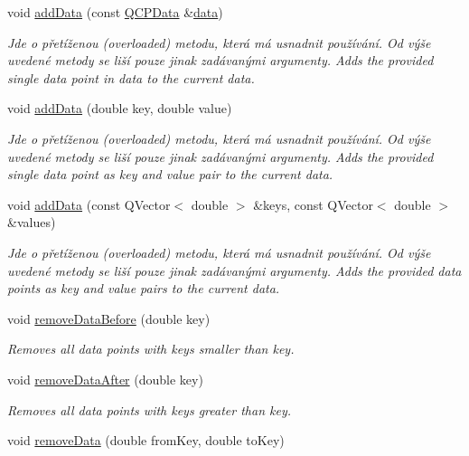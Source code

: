 \begin{DoxyCompactItemize}
void \hyperlink{classQCPGraph_a80cc91e1e0ef77eb50afc5b366d0efd9}{add\+Data} (const \hyperlink{classQCPData}{Q\+C\+P\+Data} \&\hyperlink{classQCPGraph_a2f58436df4f86a2792b776a21642b3d9}{data})
\begin{DoxyCompactList}\small\item\em Jde o přetíženou (overloaded) metodu, která má usnadnit používání. Od výše uvedené metody se liší pouze jinak zadávanými argumenty. Adds the provided single data point in {\itshape data} to the current data. \end{DoxyCompactList}\item 
void \hyperlink{classQCPGraph_a0bf98b1972286cfb7b1c4b7dd6ae2012}{add\+Data} (double key, double value)
\begin{DoxyCompactList}\small\item\em Jde o přetíženou (overloaded) metodu, která má usnadnit používání. Od výše uvedené metody se liší pouze jinak zadávanými argumenty. Adds the provided single data point as {\itshape key} and {\itshape value} pair to the current data. \end{DoxyCompactList}\item 
void \hyperlink{classQCPGraph_ab6da6377541fe80d892a9893a92db9c6}{add\+Data} (const Q\+Vector$<$ double $>$ \&keys, const Q\+Vector$<$ double $>$ \&values)
\begin{DoxyCompactList}\small\item\em Jde o přetíženou (overloaded) metodu, která má usnadnit používání. Od výše uvedené metody se liší pouze jinak zadávanými argumenty. Adds the provided data points as {\itshape key} and {\itshape value} pairs to the current data. \end{DoxyCompactList}\item 
void \hyperlink{classQCPGraph_a9fe0b3e54e8c7b61319bd03337e21e99}{remove\+Data\+Before} (double key)
\begin{DoxyCompactList}\small\item\em Removes all data points with keys smaller than {\itshape key}. \end{DoxyCompactList}\item 
void \hyperlink{classQCPGraph_ae42d645ef617cfc75fc0df58e62c522a}{remove\+Data\+After} (double key)
\begin{DoxyCompactList}\small\item\em Removes all data points with keys greater than {\itshape key}. \end{DoxyCompactList}\item 
void \hyperlink{classQCPGraph_a4a0fde50b7db9db0a85b5c5b6b10098f}{remove\+Data} (double from\+Key, double to\+Key)

\end{DoxyCompactItemize}
